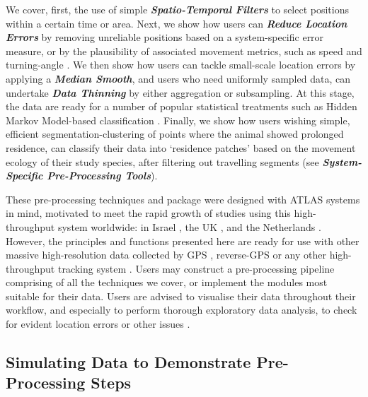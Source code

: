We cover, first, the use of simple \textit{\textbf{Spatio-Temporal Filters}} to select positions within a certain time or area.
Next, we show how users can \textit{\textbf{Reduce Location Errors}} by removing unreliable positions based on a system-specific error measure, or by the plausibility of associated movement metrics, such as speed and turning-angle \citep{seidel2018, calenge2009}.
We then show how users can tackle small-scale location errors by applying a \textit{\textbf{Median Smooth}}, and users who need uniformly sampled data, can undertake \textit{\textbf{Data Thinning}} by either aggregation or subsampling.
At this stage, the data are ready for a number of popular statistical treatments such as Hidden Markov Model-based classification \citep{michelot2016,langrock2012}.
Finally, we show how users wishing simple, efficient segmentation-clustering of points where the animal showed prolonged residence, can classify their data into `residence patches' \citep{barraquand2008, bijleveld2016} based on the movement ecology of their study species, after filtering out travelling segments (see \textit{\textbf{System-Specific Pre-Processing Tools}}).

These pre-processing techniques and package were designed with ATLAS systems in mind, motivated to meet the rapid growth of studies using this high-throughput system worldwide: in Israel \citep{toledo2014, toledo2016, toledo2020, corl2020, vilk2021}, the UK \citep{beardsworth2021a, beardsworth2021b}, and the Netherlands \citep[][]{beardsworth2022mee,bijleveld2021}. 
However, the principles and functions presented here are ready for use with other massive high-resolution data collected by GPS \citep[e.g.][]{papageorgiou2019}, reverse-GPS \citep[e.g.][]{aspillaga2021} or any other high-throughput tracking system .
Users may construct a pre-processing pipeline comprising of all the techniques we cover, or implement the modules most suitable for their data.
Users are advised to visualise their data throughout their workflow, and especially to perform thorough exploratory data analysis, to check for evident location errors or other issues \citep{slingsby2016}.


\subsection*{Simulating Data to Demonstrate Pre-Processing Steps}

